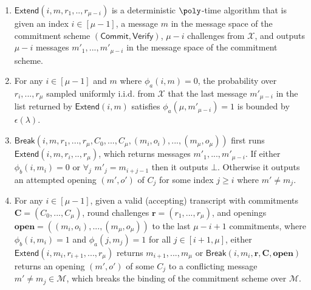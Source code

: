 \begin{definition}
\begin{enumerate}
\item  $\textsf{Extend}(i, m, r_1,..,r_{\mu-i})$ is a deterministic $\poly$-time algorithm that is given an index $i \in [\mu-1]$, a message $m$ in the message space of the commitment scheme $(\textsf{Commit}, \textsf{Verify})$, $\mu-i$ challenges from $\mathcal{X}$, and outputs $\mu-i$ messages $m'_1,...,m'_{\mu-i}$ in the message space of the commitment scheme. 
\item For any $i \in [\mu-1]$ and $m$ where $\phi_a(i,m) = 0$, the probability over $r_i,...,r_\mu$ sampled uniformly i.i.d. from $\mathcal{X}$ that the last message $m'_{\mu-i}$ in the list returned by $\textsf{Extend}(i, m)$ satisfies $\phi_a(\mu, m'_{\mu-i}) = 1$ is bounded by $\epsilon(\lambda)$.   

\item $\textsf{Break}(i, m, r_1,...,r_\mu, C_0,...,C_\mu, (m_i, o_i),...,(m_{\mu}, o_{\mu}))$ first runs $\textsf{Extend}(i, m, r_i,..,r_{\mu})$, which returns messages $m'_1,...,m'_{\mu-i}$. If  either $\phi_b(i, m_i) = 0$ or $\forall_j$ $m'_j = m_{i + j -1}$ then it outputs $\bot$. Otherwise it outputs an attempted opening $(m', o')$ of $C_j$ for some index $j \geq i$ where $m' \neq m_j$. %



\item For any $i \in [\mu-1]$, given a valid (accepting) transcript with commitments $\mathbf{C} = (C_0,...,C_\mu)$, round challenges $\mathbf{r} = (r_1,...,r_{\mu})$, and openings $\mathbf{open} = ((m_{i},o_{i}),...,(m_\mu, o_\mu))$ to the last $\mu-i+1$ commitments, where $\phi_b(i, m_i) = 1$ and $\phi_a(j, m_j) = 1$ for all $j \in [i+1,\mu]$, either $\textsf{Extend}(i, m_i, r_{i+1},...,r_\mu)$ returns $m_{i+1},...,m_{\mu}$ or $\textsf{Break}(i, m_i, \mathbf{r}, \mathbf{C}, \mathbf{open})$ returns an opening $(m', o')$ of some $C_j$ to a conflicting message $m' \neq m_j \in \mathcal{M}$, which breaks the binding of the commitment scheme over $\mathcal{M}$.
\end{enumerate} 

\end{definition} 

